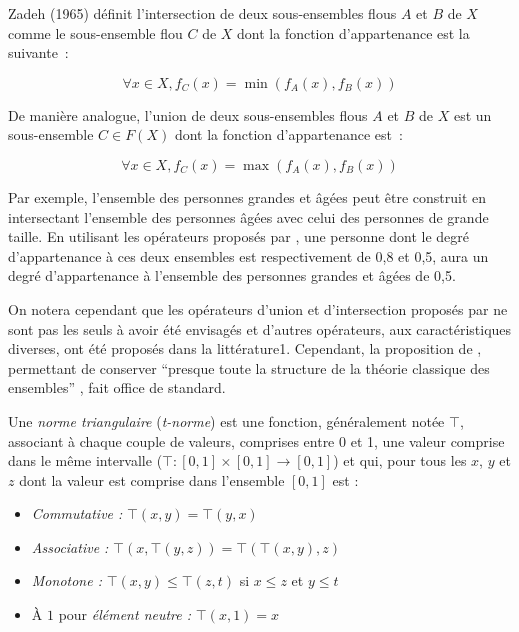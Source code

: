Zadeh (1965) définit l’intersection de deux sous-ensembles flous $A$
et $B$ de $X$ comme le sous-ensemble flou $C$ de $X$ dont la fonction
d’appartenance est la suivante :

\begin{equation}
  \label{eq:norm_zadeh}
  ∀x ∈ X, f_C (x) = \min(f_A(x), f_B(x))
\end{equation}

De manière analogue, l’union de deux sous-ensembles flous $A$ et $B$
de $X$ est un sous-ensemble $C ∈ F(X)$ dont la fonction d’appartenance
est :

\begin{equation}
  \label{eq:conorm_zadeh}
  ∀x ∈ X, f_C (x) = \max(f_A(x), f_B(x))
\end{equation}

Par exemple, l’ensemble des personnes grandes et âgées peut être
construit en intersectant l’ensemble des personnes âgées avec celui
des personnes de grande taille. En utilisant les opérateurs proposés
par \textcite{Zadeh1965}, une personne dont le degré d’appartenance à
ces deux ensembles est respectivement de 0,8 et 0,5, aura un degré
d’appartenance à l’ensemble des personnes grandes et âgées de 0,5.

On notera cependant que les opérateurs d’union et d’intersection
proposés par \textcite{Zadeh1965} ne sont pas les seuls à avoir été
envisagés et d’autres opérateurs, aux caractéristiques diverses, ont
été proposés dans la littérature1. Cependant, la proposition de
\textcite{Zadeh1965}, permettant de conserver \enquote{presque toute
  la structure de la théorie classique des ensembles}
\autocite{Bouchon-Meunier2007}, fait office de standard.

Une \emph{norme triangulaire} (\emph{t-norme}) est une fonction,
généralement notée $\top$, associant à chaque couple de valeurs,
comprises entre 0 et 1, une valeur comprise dans le même intervalle
(\ie $\top : [0,1] × [0,1] \rightarrow [0,1]$) et qui, pour tous les
$x$, $y$ et $z$ dont la valeur est comprise dans l'ensemble $[0,1]$
est :

\begin{itemize}
\item \emph{Commutative :} \(⊤(x,y) = ⊤(y,x)\)
\item \emph{Associative :} \(⊤(x,⊤(y,z)) = ⊤(⊤(x,y),z)\)
\item \emph{Monotone :} \(⊤(x,y) ≤ ⊤(z,t)\) si \(x ≤ z\) et \(y ≤ t\)
\item À \(1\) pour \emph{élément neutre :} \(⊤(x,1) = x\)
\end{itemize}

